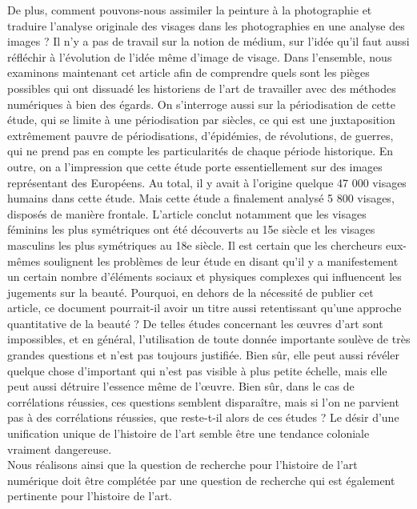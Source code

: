 \documentclass[a4paper, twoside, 12pt]{book}
\begin{document}
De plus, comment pouvons-nous assimiler la peinture à la photographie et traduire l'analyse originale des visages dans les photographies en une analyse des images ? Il n'y a pas de travail sur la notion de médium, sur l'idée qu'il faut aussi réfléchir à l'évolution de l'idée même d'image de visage. Dans l'ensemble, nous examinons maintenant cet article afin de comprendre quels sont les pièges possibles qui ont dissuadé les historiens de l'art de travailler avec des méthodes numériques à bien des égards. On s'interroge aussi sur la périodisation de cette étude, qui se limite à une périodisation par siècles, ce qui est une juxtaposition extrêmement pauvre de périodisations, d'épidémies, de révolutions, de guerres, qui ne prend pas en compte les particularités de chaque période historique. En outre, on a l'impression que cette étude porte essentiellement sur des images représentant des Européens. Au total, il y avait à l'origine quelque 47 000 visages humains dans cette étude. Mais cette étude a finalement analysé 5 800 visages, disposés de manière frontale.  L'article conclut notamment que les visages féminins les plus symétriques ont été découverts au 15e siècle et les visages masculins les plus symétriques au 18e siècle. Il est certain que les chercheurs eux-mêmes soulignent les problèmes de leur étude en disant qu'il y a manifestement un certain nombre d'éléments sociaux et physiques complexes qui influencent les jugements sur la beauté. Pourquoi, en dehors de la nécessité de publier cet article, ce document pourrait-il avoir un titre aussi retentissant qu'une approche quantitative de la beauté ? De telles études concernant les œuvres d'art sont impossibles, et en général, l'utilisation de toute donnée importante soulève de très grandes questions et n'est pas toujours justifiée. Bien sûr, elle peut aussi révéler quelque chose d'important qui n'est pas visible à plus petite échelle, mais elle peut aussi détruire l'essence même de l'œuvre. Bien sûr, dans le cas de corrélations réussies, ces questions semblent disparaître, mais si l'on ne parvient pas à des corrélations réussies, que reste-t-il alors de ces études ? Le désir d'une unification unique de l'histoire de l'art semble être une tendance coloniale vraiment dangereuse.\\

Nous réalisons ainsi que la question de recherche pour l'histoire de l'art numérique doit être complétée par une question de recherche qui est également pertinente pour l'histoire de l'art. \\
\end{document}
